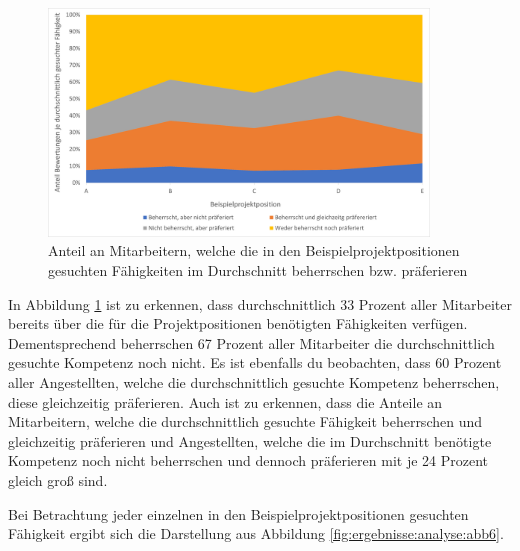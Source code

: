\begin{figure}[h]
	\centering
	\includegraphics[width=0.9\textwidth]{gfx/anteil-bewertungen-je-projektposition.png}
	\caption{Anteil an Mitarbeitern, welche die in den Beispielprojektpositionen gesuchten Fähigkeiten im Durchschnitt beherrschen bzw. präferieren}
	\label{fig:ergebnisse:analyse:abb5}
\end{figure}

In Abbildung \ref{fig:ergebnisse:analyse:abb5} ist zu erkennen, dass durchschnittlich 33 Prozent aller Mitarbeiter bereits über die für die Projektpositionen benötigten Fähigkeiten verfügen. Dementsprechend beherrschen 67 Prozent aller Mitarbeiter die durchschnittlich gesuchte Kompetenz noch nicht. Es ist ebenfalls du beobachten, dass 60 Prozent aller Angestellten, welche die durchschnittlich gesuchte Kompetenz beherrschen, diese gleichzeitig präferieren. Auch ist zu erkennen, dass die Anteile an Mitarbeitern, welche die durchschnittlich gesuchte Fähigkeit beherrschen und gleichzeitig präferieren und Angestellten, welche die im Durchschnitt benötigte Kompetenz noch nicht beherrschen und dennoch präferieren mit je 24 Prozent gleich groß sind.

Bei Betrachtung jeder einzelnen in den Beispielprojektpositionen gesuchten Fähigkeit ergibt sich die Darstellung aus Abbildung \ref{fig:ergebnisse:analyse:abb6}.


